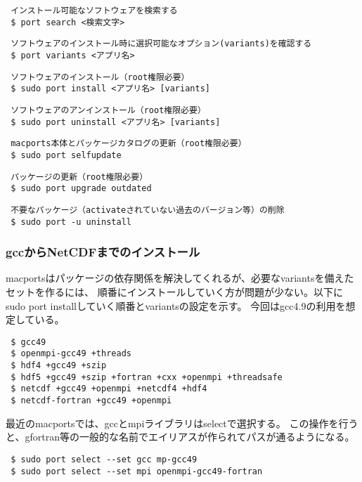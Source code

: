 \begin{verbatim}
 インストール可能なソフトウェアを検索する
 $ port search <検索文字>
\end{verbatim}
\begin{verbatim}
 ソフトウェアのインストール時に選択可能なオプション(variants)を確認する
 $ port variants <アプリ名>
\end{verbatim}
\begin{verbatim}
 ソフトウェアのインストール（root権限必要）
 $ sudo port install <アプリ名> [variants]
\end{verbatim}
\begin{verbatim}
 ソフトウェアのアンインストール（root権限必要）
 $ sudo port uninstall <アプリ名> [variants]
\end{verbatim}
\begin{verbatim}
 macports本体とパッケージカタログの更新（root権限必要）
 $ sudo port selfupdate
\end{verbatim}
\begin{verbatim}
 パッケージの更新（root権限必要）
 $ sudo port upgrade outdated
\end{verbatim}
\begin{verbatim}
 不要なパッケージ（activateされていない過去のバージョン等）の削除
 $ sudo port -u uninstall
\end{verbatim}

\subsubsection{gccからNetCDFまでのインストール}

macportsはパッケージの依存関係を解決してくれるが、必要なvariantsを備えたセットを作るには、
順番にインストールしていく方が問題が少ない。以下にsudo port installしていく順番とvariantsの設定を示す。
今回はgcc4.9の利用を想定している。
\begin{verbatim}
 $ gcc49
 $ openmpi-gcc49 +threads
 $ hdf4 +gcc49 +szip
 $ hdf5 +gcc49 +szip +fortran +cxx +openmpi +threadsafe
 $ netcdf +gcc49 +openmpi +netcdf4 +hdf4
 $ netcdf-fortran +gcc49 +openmpi
\end{verbatim}

最近のmacportsでは、gccとmpiライブラリはselectで選択する。
この操作を行うと、gfortran等の一般的な名前でエイリアスが作られてパスが通るようになる。
\begin{verbatim}
 $ sudo port select --set gcc mp-gcc49
 $ sudo port select --set mpi openmpi-gcc49-fortran
\end{verbatim}

